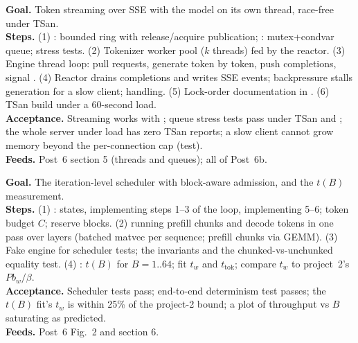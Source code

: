 \textbf{Goal.} Token streaming over SSE with the model on its own thread, race-free under TSan.\\
\textbf{Steps.} (1) : bounded ring with release/acquire publication; : mutex+condvar queue; stress tests. (2) Tokenizer worker pool ($k$ threads) fed by the reactor. (3) Engine thread loop: pull requests, generate token by token, push completions, signal . (4) Reactor drains completions and writes SSE events; backpressure stalls generation for a slow client;  handling. (5) Lock-order documentation in . (6) TSan build under a 60-second load.\\
\textbf{Acceptance.} Streaming works with ; queue stress tests pass under TSan and ; the whole server under load has zero TSan reports; a slow client cannot grow memory beyond the per-connection cap (test).\\
\textbf{Feeds.} Post~6 section 5 (threads and queues); all of Post~6b.

\textbf{Goal.} The iteration-level scheduler with block-aware admission, and the $t(B)$ measurement.\\
\textbf{Steps.} (1) :  states,  implementing steps 1--3 of the loop,  implementing 5--6; token budget $C$; reserve blocks. (2)  running prefill chunks and decode tokens in one pass over layers (batched matvec per sequence; prefill chunks via GEMM). (3) Fake engine for scheduler tests; the invariants and the chunked-vs-unchunked equality test. (4) : $t(B)$ for $B = 1..64$; fit $t_w$ and $t_{\text{tok}}$; compare $t_w$ to project~2's $Pb_w/\beta$.\\
\textbf{Acceptance.} Scheduler tests pass; end-to-end determinism test passes; the $t(B)$ fit's $t_w$ is within 25\% of the project-2 bound; a plot of throughput vs $B$ saturating as predicted.\\
\textbf{Feeds.} Post~6 Fig.~2 and section 6.


